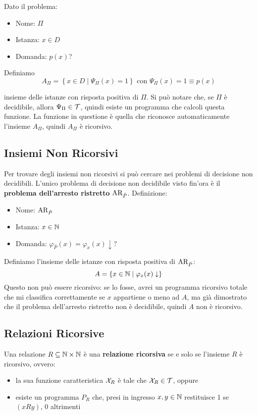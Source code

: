 Dato il problema:
\begin{itemize}
	\item Nome: $\Pi$
	\item Istanza: $x \in D$
	\item Domanda: $p(x)$?
\end{itemize}

Definiamo
$$ A_\Pi = \left\{x \in D \mid \Psi_\Pi (x) = 1\right\} \text{ con } \Psi_\Pi (x) = 1 \equiv p(x) $$

insieme delle istanze con risposta positiva di $\Pi$. Si può notare che, se $\Pi$ è decidibile, allora $\Psi_\Pi \in \mathcal{T}$, quindi esiste un programma che calcoli questa funzione. La funzione in questione è quella che riconosce automaticamente l'insieme $A_\Pi$, quindi $A_\Pi$ è ricorsivo.

\subsection{Insiemi Non Ricorsivi}

Per trovare degli insiemi non ricorsivi si può cercare nei problemi di decisione non decidibili. L'unico problema di decisione non decidibile visto fin'ora è il \textbf{problema dell'arresto ristretto} $\text{AR}_{\hat{P}}$. Definizione:
\begin{itemize}
	\item Nome: $\text{AR}_{\hat{P}}$
	\item Istanza: $x \in \mathbb{N}$
	\item Domanda: $\varphi_{\hat{P}} (x) = \varphi_x (x) \downarrow$?
\end{itemize}

Definiamo l'insieme delle istanze con risposta positiva di $\text{AR}_{\hat{P}}$:
$$ A = \left\{x \in \mathbb{N} \mid \varphi_x (x) \downarrow \right\}$$
Questo non può essere ricorsivo: se lo fosse, avrei un programma ricorsivo totale che mi classifica correttamente se $x$ appartiene o meno ad $A$, ma già dimostrato che il problema dell'arresto ristretto non è decidibile, quindi $A$ non è ricorsivo.

\subsection{Relazioni Ricorsive}

Una relazione $R \subseteq \mathbb{N} \times \mathbb{N}$ è una \textbf{relazione ricorsiva} se e solo se l'insieme $R$ è ricorsivo, ovvero:
\begin{itemize}
	\item la sua funzione caratteristica $\mathcal{X}_R$ è tale che $\mathcal{X}_R \in \mathcal{T}$, oppure
	\item esiste un programma $P_R$ che, presi in ingresso $x,y \in \mathbb{N}$ restituisce 1 se $(xRy)$, 0 altrimenti
\end{itemize}

